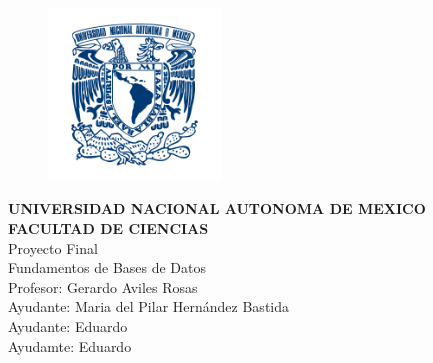 \documentclass{article}
\author{Barajas Figueroa José de Jesús}
\begin{document}
\marginsize{3cm}{2cm}{2cm}{2cm} 
\begin{titlepage} %
\begin{center}
    
\begin{figure}[ht]
\begin{center}
\includegraphics[width=1.8in]{./img/unamlogo.png}
\end{center}
\end{figure}

\begin{center}
  {\Large \textbf{
      \vspace*{.5in}   
UNIVERSIDAD NACIONAL AUTONOMA DE MEXICO\\
\vspace*{.3in}
FACULTAD DE CIENCIAS}}\\
\vspace*{.3in}
Proyecto Final\\%
\vspace*{.3in}
Fundamentos de Bases de Datos\\
\vspace*{.3in}
Profesor: Gerardo Aviles Rosas\\
Ayudante: Maria del Pilar Hernández Bastida\\
Ayudante: Eduardo \\
Ayudamte: Eduardo \\
\vspace*{.3in}


\end{center}
\end{center}
\end{titlepage}
\end{document}
